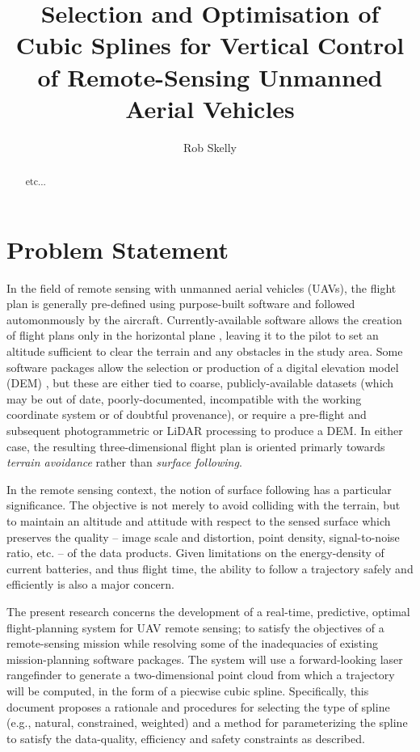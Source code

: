 \documentclass[10pt]{article}
\author{Rob Skelly}
\title{Selection and Optimisation of Cubic Splines for Vertical Control of Remote-Sensing Unmanned Aerial Vehicles}
\begin{document}
\maketitle

\begin{abstract}
etc...
\end{abstract}

\section{Problem Statement}

In the field of remote sensing with unmanned aerial vehicles (UAVs), the flight plan is generally pre-defined using purpose-built software and followed automonmously by the aircraft. Currently-available software allows the creation of flight plans only in the horizontal plane \cite{AruPilot2018,DJI2018a,Microdrones2018,Group2018,UAVToolbox2018}, leaving it to the pilot to set an altitude sufficient to clear the terrain and any obstacles in the study area. Some software packages allow the selection or production of a digital elevation model (DEM) \cite{PrecisionHawk2018,UgCS2018}, but these are either tied to coarse, publicly-available datasets (which may be out of date, poorly-documented, incompatible with the working coordinate system or of doubtful provenance), or require a pre-flight and subsequent photogrammetric or LiDAR processing to produce a DEM. In either case, the resulting three-dimensional flight plan is oriented primarly towards \emph{terrain avoidance} rather than \emph{surface following}.

In the remote sensing context, the notion of surface following has a particular significance. The objective is not merely to avoid colliding with the terrain, but to maintain an altitude and attitude with respect to the sensed surface which preserves the quality -- image scale and distortion, point density, signal-to-noise ratio, etc. -- of the data products. Given limitations on the energy-density of current batteries, and thus flight time, the ability to follow a trajectory safely and efficiently is also a major concern.

The present research concerns the development of a real-time, predictive, optimal flight-planning system for UAV remote sensing; to satisfy the objectives of a remote-sensing mission while resolving some of the inadequacies of existing mission-planning software packages. The system will use a forward-looking laser rangefinder to generate a two-dimensional point cloud from which a trajectory will be computed, in the form of a piecwise cubic spline. Specifically, this document proposes a rationale and procedures for selecting the type of spline (e.g., natural, constrained, weighted) and a method for parameterizing the spline to satisfy the data-quality, efficiency and safety constraints as described. 
\end{document}
